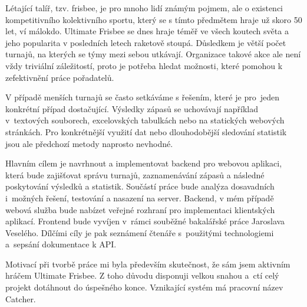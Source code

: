 \begin{introduction}
 Létající talíř, tzv. frisbee, je pro mnoho lidí známým pojmem, ale o existenci kompetitivního kolektivního sportu,
 který se s tímto předmětem hraje už skoro 50 let, ví málokdo. Ultimate Frisbee se dnes hraje téměř
 ve všech koutech světa a jeho popularita v posledních letech raketově stoupá. Důsledkem je větší počet turnajů, na kterých se týmy mezi sebou utkávají.
 Organizace takové akce ale není vždy triviální záležitostí, proto je potřeba hledat možnosti, které pomohou k zefektivnění práce pořadatelů.
 
 V případě menších turnajů se často setkáváme s řešením, které je pro~jeden konkrétní případ dostačující.
 Výsledky zápasů se uchovávají například v~textových souborech, excelovských tabulkách nebo na statických webových stránkách.
 Pro konkrétnější využití dat nebo dlouhodobější sledování statistik jsou ale předchozí metody naprosto nevhodné.
 
 Hlavním cílem je navrhnout a implementovat backend pro webovou aplikaci, která bude zajišťovat správu turnajů, zaznamenávání
 zápasů a následné poskytování výsledků a statistik. Sou\-částí práce bude analýza dosavadních
 i~možných řešení, testování a nasazení na server. Backend, v mém případě webová služba bude
 nabízet veřejné rozhraní pro implementaci klientských aplikací.
 Frontend bude vyvíjen v~rámci souběžné bakalářské práce Jaroslava Veselého.
 Dílčími cíly je pak seznámení čtenáře s~použitými technologiemi a~sepsání dokumentace k API.
 
 Motivací při tvorbě práce mi byla především skutečnost, že sám jsem aktivním hráčem Ultimate Frisbee.
 Z toho důvodu disponuji velkou snahou a~ctí celý projekt dotáhnout do úspešného konce. Vznikající systém má pracovní název Catcher.
\end{introduction}